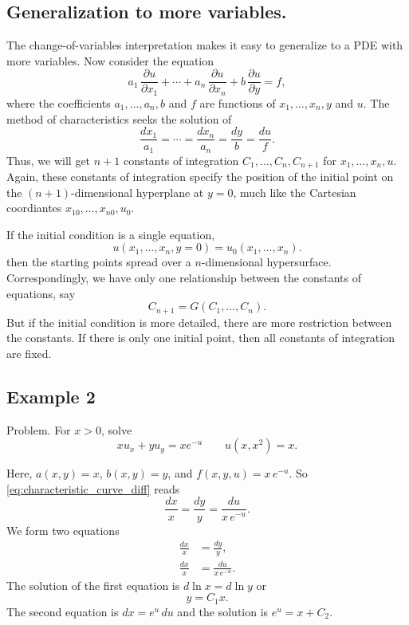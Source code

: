 \documentclass{article}
\begin{document}
\subsection{Generalization to more variables.}

The change-of-variables interpretation makes it
easy to generalize to a PDE with more variables.
%
Now consider the equation
$$
a_1 \, \frac{\partial u}{\partial x_1}
+
\cdots
+
a_n \, \frac{\partial u}{\partial x_n}
+
b \, \frac{\partial u}{\partial y}
=
f,
$$
where the coefficients $a_1, \dots, a_n, b$ and $f$
are functions of
$x_1, \dots, x_n, y$ and $u$.
%
The method of characteristics seeks the solution of
$$
\frac{dx_1}{ a_1 }
=
\cdots
=\frac{dx_n}{ a_n }
= \frac{dy}{ b }
= \frac{du}{ f }.
$$
Thus, we will get $n+1$ constants of integration
$C_1, \dots, C_n, C_{n+1}$
for $x_1, \dots, x_n, u$.
%
Again, these constants of integration
specify the position of the initial point
on the $(n+1)$-dimensional hyperplane at $y = 0$,
much like the Cartesian coordiantes
$x_{10}, \dots, x_{n0}, u_0$.

If the initial condition is a single equation,
$$
u(x_1, \dots, x_n, y = 0) = u_0(x_1, \dots, x_n).
$$
then the starting points spread over
a $n$-dimensional hypersurface.
%
Correspondingly,
we have only one relationship between the constants
of equations, say
$$
C_{n+1} = G(C_1, \dots, C_n).
$$
But if the initial condition is more detailed,
there are more restriction between the constants.
%
If there is only one initial point,
then all constants of integration are fixed.

\subsection{Example 2}

Problem.
For $x > 0$, solve
$$
x u_x + y u_y = x e^{-u}
\qquad
u(x, x^2) = x.
$$

Here, $a(x, y) = x$, $b(x, y) = y$, and $f(x, y, u) = x \, e^{-u}$.
So \eqref{eq:characteristic_curve_diff} reads
$$
\frac{ dx } { x } =
\frac{ dy } { y } =
\frac{ du } { x \, e^{-u} }.
$$
We form two equations
$$
\begin{aligned}
\frac{ dx } { x } &= \frac{ dy } { y}, \\
\frac{ dx } { x } &= \frac{ du } { x \, e^{-u} }.
\end{aligned}
$$
The solution of the first equation is
$d\ln x = d\ln y$ or
\begin{equation}
y = C_1 x.
\label{eq:example2_sol1}
\end{equation}
The second equation is
$dx = e^u \, du$ and the solution is
$e^u = x + C_2$.
\end{document}
